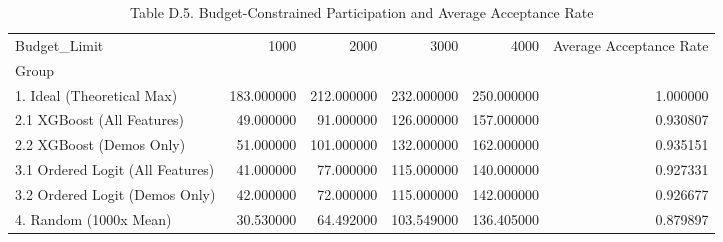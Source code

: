 \begin{table}
\caption{Table D.5. Budget-Constrained Participation and Average Acceptance Rate}
\begin{tabular}{lrrrrr}
\toprule
Budget_Limit & 1000 & 2000 & 3000 & 4000 & Average Acceptance Rate \\
Group &  &  &  &  &  \\
\midrule
1. Ideal (Theoretical Max) & 183.000000 & 212.000000 & 232.000000 & 250.000000 & 1.000000 \\
2.1 XGBoost (All Features) & 49.000000 & 91.000000 & 126.000000 & 157.000000 & 0.930807 \\
2.2 XGBoost (Demos Only) & 51.000000 & 101.000000 & 132.000000 & 162.000000 & 0.935151 \\
3.1 Ordered Logit (All Features) & 41.000000 & 77.000000 & 115.000000 & 140.000000 & 0.927331 \\
3.2 Ordered Logit (Demos Only) & 42.000000 & 72.000000 & 115.000000 & 142.000000 & 0.926677 \\
4. Random (1000x Mean) & 30.530000 & 64.492000 & 103.549000 & 136.405000 & 0.879897 \\
\bottomrule
\end{tabular}
\end{table}

